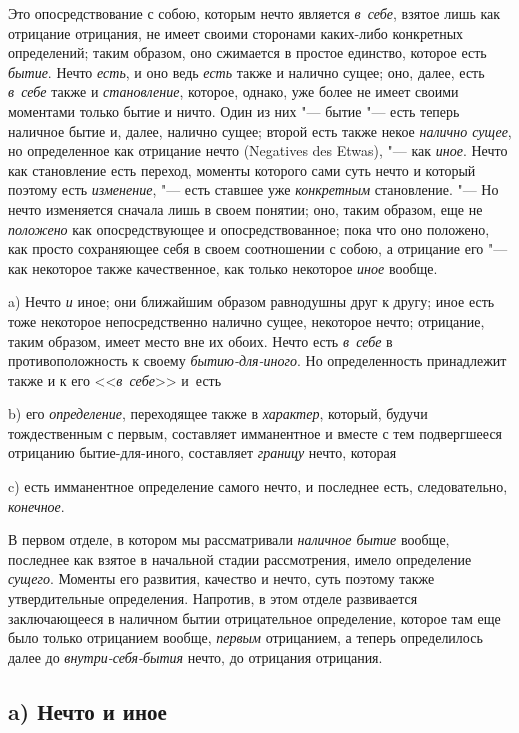 Это опосредствование с собою, которым нечто является {\em в~себе}, взятое лишь
как отрицание отрицания, не имеет своими сторонами каких-либо конкретных
определений; таким образом, оно сжимается в простое единство, которое есть
{\em бытие}. Нечто {\em есть}, и оно ведь {\em есть} также и налично сущее;
оно, далее, есть {\em в~себе} также и {\em становление}, которое, однако, уже
более не имеет своими моментами только бытие и ничто. Один из них "--- бытие
"--- есть теперь наличное бытие и, далее, налично сущее; второй есть также
некое {\em налично сущее}, но определенное как отрицание нечто (Nega\-tives des
Etwas), "--- как {\em иное}. Нечто как становление есть переход, моменты
которого сами суть нечто и который поэтому есть {\em изменение}, "--- есть
ставшее уже {\em конкретным} становление. "--- Но нечто изменяется сначала лишь
в своем понятии; оно, таким образом, еще не {\em положено} как опосредствующее
и опосредствованное; пока что оно положено, как просто сохраняющее себя в своем
соотношении с собою, а отрицание его "--- как некоторое также качественное, как
только некоторое {\em иное} вообще.


a) Нечто {\em и} иное; они ближайшим образом равнодушны друг к другу; иное есть
тоже некоторое непосредственно налично сущее, некоторое нечто; отрицание, таким
образом, имеет место вне их обоих. Нечто есть {\em в~себе} в противоположность
к своему {\em бытию-для-иного}. Но определенность принадлежит также и к его
<<{\em в~себе}>> и~есть

b) его {\em определение}, переходящее также в {\em характер}, который, будучи
тождественным с первым, составляет имманентное и вместе с тем подвергшееся
отрицанию бытие-для-иного, составляет {\em границу} нечто, которая

c) есть имманентное определение самого нечто, и последнее есть,
следовательно, {\em конечное}.

В первом отделе, в котором мы рассматривали {\em наличное бытие} вообще,
последнее как взятое в начальной стадии рассмотрения, имело определение
{\em сущего}. Моменты его развития, качество и нечто, суть поэтому также
утвердительные определения. Напротив, в этом отделе развивается заключающееся
в наличном бытии отрицательное определение, которое там еще было только
отрицанием вообще, {\em первым} отрицанием, а теперь определилось далее до
{\em внутри-себя-бытия} нечто, до отрицания отрицания.

\subsection[a) Нечто и иное]{a) Нечто и иное}

